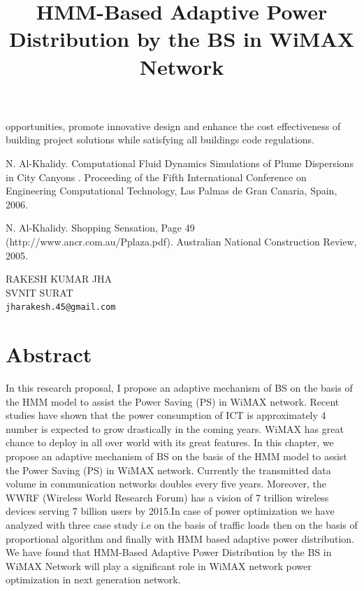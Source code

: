 \documentclass[article,A4,11pt]{llncs}%
\begin{document}
opportunities, promote innovative design and enhance the cost effectiveness of building project solutions while satisfying all buildings code regulations.



\begin{thebibliography}{10}
{\sc N. Al-Khalidy}. {Computational Fluid Dynamics Simulations of Plume Dispersions in City Canyons }. Proceeding of the Fifth International Conference on Engineering Computational Technology, Las Palmas de Gran Canaria, Spain, 2006.

{\sc N. Al-Khalidy}. {Shopping Sensation, Page 49 (http://www.ancr.com.au/Pplaza.pdf)}. Australian National Construction Review, 2005.
\end{thebibliography}

\title{HMM-Based Adaptive Power Distribution by the BS in WiMAX Network}
 \author{} \institute{}
\maketitle
\begin{center}
{\large RAKESH KUMAR JHA}\\
SVNIT SURAT\\
{\tt jharakesh.45@gmail.com}
\end{center}

\section*{Abstract}
In this research proposal, I propose an adaptive mechanism of BS on the basis of the HMM
model to assist the Power Saving (PS) in WiMAX network. Recent studies have shown that the power
consumption of ICT is approximately 4 %
number is expected to grow drastically in the coming years. WiMAX has great chance to deploy in all
over world with its great features. In this chapter, we propose an adaptive mechanism of BS on the basis
of the HMM model to assist the Power Saving (PS) in WiMAX network. Currently the transmitted data
volume in communication networks doubles every five years. Moreover, the WWRF (Wireless World
Research Forum) has a vision of 7 trillion wireless devices serving 7 billion users by 2015.In case of
power optimization we have analyzed with three case study i.e on the basis of traffic loads then on the
basis of proportional algorithm and finally with HMM based adaptive power distribution. We have found
that HMM-Based Adaptive Power Distribution by the BS in WiMAX Network will play a significant role
in WiMAX network power optimization in next generation network.
\end{document}
